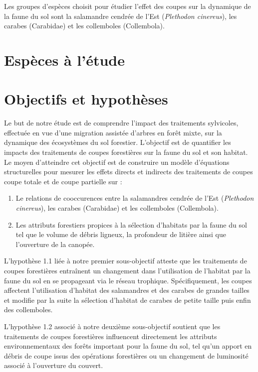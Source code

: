 Les groupes d'espèces choisit pour étudier l'effet des coupes sur la dynamique de la faune du sol sont la salamandre cendrée de l'Est (\textit{Plethodon cinereus}), 
les carabes (Carabidae) et les collemboles (Collembola).


\section*{Espèces à l'étude}
\label{sec:species}


\section*{Objectifs et hypothèses}
\label{sec:objectifs}

Le but de notre étude est de comprendre l'impact des traitements sylvicoles, effectuée en vue d'une migration assistée d'arbres en forêt mixte, sur la dynamique des écosystèmes du sol forestier.
L'objectif est de quantifier les impacts des traitements de coupes forestières sur la faune du sol et son habitat. 
Le moyen d'atteindre cet objectif est de construire un modèle d'équations structurelles pour mesurer les effets directs et indirects des traitements de coupes coupe totale et de coupe partielle sur : 

\begin{enumerate}
    \item Le relations de cooccurences entre la salamandres cendrée de l'Est (\textit{Plethodon cinereus}), les carabes (Carabidae) et les collemboles (Collembola).
    \item Les attributs forestiers propices à la sélection d'habitats par la faune du sol tel que le volume de débris ligneux, la profondeur de litière ainsi que l'ouverture de la canopée. 
\end{enumerate}


L'hypothèse 1.1 liée à notre premier sous-objectif atteste que les traitements de coupes forestières entraînent un changement dans l'utilisation de l'habitat par la faune du sol en se propageant via le réseau trophique. 
Spécifiquement, les coupes affectent l'utilisation d'habitat des salamandres et des carabes de grandes tailles et modifie par la suite la sélection d'habitat de carabes de petite taille puis enfin des collemboles. 

L'hypothèse 1.2 associé à notre deuxième sous-objectif soutient que les traitements de coupes forestières influencent directement les attributs environnementaux des forêts important pour la faune du sol, 
tel qu'un apport en débris de coupe issus des opérations forestières ou un changement de luminosité associé à l'ouverture du couvert.


\cleardoublepage



